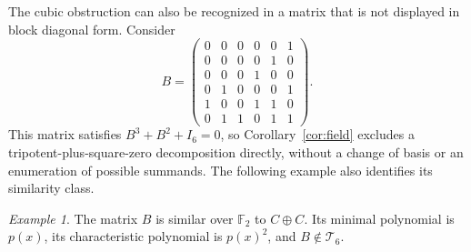 \documentclass[12pt]{amsart}
\theoremstyle{remark}
\newtheorem{example}[theorem]{Example}
\numberwithin{equation}{section}
\theoremstyle{definition}
\newcommand{\F}{\mathbb F}
\newcommand{\Id}{I}
\newcommand{\TS}{\mathcal T}
\begin{document}
The cubic obstruction can also be recognized in a matrix that is not displayed in block diagonal form. Consider
\begin{equation}
 B=\begin{pmatrix}
 0&0&0&0&0&1\\
 0&0&0&0&1&0\\
 0&0&0&1&0&0\\
 0&1&0&0&0&1\\
 1&0&0&1&1&0\\
 0&1&1&0&1&1
 \end{pmatrix}.
\end{equation}
This matrix satisfies $B^3+B^2+\Id_6=0$, so Corollary~\ref{cor:field} excludes a tripotent-plus-square-zero decomposition directly, without a change of basis or an enumeration of possible summands. The following example also identifies its similarity class.

\begin{example}\label{ex:B6}
The matrix $B$ is similar over $\F_2$ to $C\oplus C$. Its minimal polynomial is $p(x)$, its characteristic polynomial is $p(x)^2$, and $B\notin\TS_6$.
\end{example}
\end{document}
